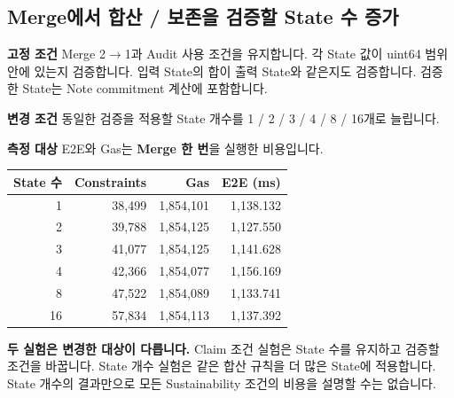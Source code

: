 \documentclass[11pt,a4paper]{article}
\begin{document}
\par\noindent\begin{minipage}{\linewidth}
\subsection*{Merge에서 합산 / 보존을 검증할 State 수 증가}
\textbf{고정 조건}\newline
Merge 2$\rightarrow$1과 Audit 사용 조건을 유지합니다.\newline
각 State 값이 uint64 범위 안에 있는지 검증합니다.\newline
입력 State의 합이 출력 State와 같은지도 검증합니다.\newline
검증한 State는 Note commitment 계산에 포함합니다.\par\smallskip
\textbf{변경 조건}\newline
동일한 검증을 적용할 State 개수를 1 / 2 / 3 / 4 / 8 / 16개로 늘립니다.\par\smallskip
\textbf{측정 대상}\newline
E2E와 Gas는 \textbf{Merge 한 번}을 실행한 비용입니다.\par\smallskip
\begin{center}\small\begin{tabular}{@{}rrrr@{}}\toprule
\textbf{State 수} & \textbf{Constraints} & \textbf{Gas} & \textbf{E2E (ms)} \\
\midrule
1 & 38,499 & 1,854,101 & 1,138.132 \\
2 & 39,788 & 1,854,125 & 1,127.550 \\
3 & 41,077 & 1,854,125 & 1,141.628 \\
4 & 42,366 & 1,854,077 & 1,156.169 \\
8 & 47,522 & 1,854,089 & 1,133.741 \\
16 & 57,834 & 1,854,113 & 1,137.392 \\
\bottomrule\end{tabular}\end{center}
\end{minipage}\par\medskip
\textbf{두 실험은 변경한 대상이 다릅니다.}\newline
Claim 조건 실험은 State 수를 유지하고 검증할 조건을 바꿉니다.\newline
State 개수 실험은 같은 합산 규칙을 더 많은 State에 적용합니다.\newline
State 개수의 결과만으로 모든 Sustainability 조건의 비용을 설명할 수는 없습니다.
\end{document}
